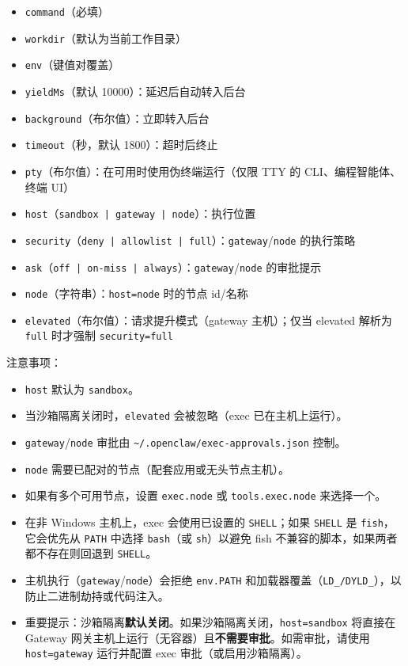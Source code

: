 \begin{itemize}
  \item \texttt{command}（必填）
  \item \texttt{workdir}（默认为当前工作目录）
  \item \texttt{env}（键值对覆盖）
  \item \texttt{yieldMs}（默认 10000）：延迟后自动转入后台
  \item \texttt{background}（布尔值）：立即转入后台
  \item \texttt{timeout}（秒，默认 1800）：超时后终止
  \item \texttt{pty}（布尔值）：在可用时使用伪终端运行（仅限 TTY 的 CLI、编程智能体、终端 UI）
  \item \texttt{host}（\texttt{sandbox | gateway | node}）：执行位置
  \item \texttt{security}（\texttt{deny | allowlist | full}）：\texttt{gateway}/\texttt{node} 的执行策略
  \item \texttt{ask}（\texttt{off | on-miss | always}）：\texttt{gateway}/\texttt{node} 的审批提示
  \item \texttt{node}（字符串）：\texttt{host=node} 时的节点 id/名称
  \item \texttt{elevated}（布尔值）：请求提升模式（gateway 主机）；仅当 elevated 解析为 \texttt{full} 时才强制 \texttt{security=full}
\end{itemize}


注意事项：

\begin{itemize}
  \item \texttt{host} 默认为 \texttt{sandbox}。
  \item 当沙箱隔离关闭时，\texttt{elevated} 会被忽略（exec 已在主机上运行）。
  \item \texttt{gateway}/\texttt{node} 审批由 \texttt{\textasciitilde{}/.openclaw/exec-approvals.json} 控制。
  \item \texttt{node} 需要已配对的节点（配套应用或无头节点主机）。
  \item 如果有多个可用节点，设置 \texttt{exec.node} 或 \texttt{tools.exec.node} 来选择一个。
  \item 在非 Windows 主机上，exec 会使用已设置的 \texttt{SHELL}；如果 \texttt{SHELL} 是 \texttt{fish}，它会优先从 \texttt{PATH} 中选择 \texttt{bash}（或 \texttt{sh}）以避免 fish 不兼容的脚本，如果两者都不存在则回退到 \texttt{SHELL}。
  \item 主机执行（\texttt{gateway}/\texttt{node}）会拒绝 \texttt{env.PATH} 和加载器覆盖（\texttt{LD\_\textit{}/\texttt{DYLD\_}}），以防止二进制劫持或代码注入。
  \item 重要提示：沙箱隔离\textbf{默认关闭}。如果沙箱隔离关闭，\texttt{host=sandbox} 将直接在 Gateway 网关主机上运行（无容器）且\textbf{不需要审批}。如需审批，请使用 \texttt{host=gateway} 运行并配置 exec 审批（或启用沙箱隔离）。
\end{itemize}


